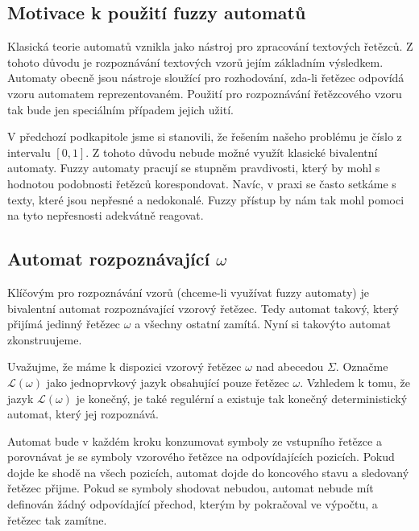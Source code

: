 \documentclass[a4paper,10pt]{article}
\begin{document}
\subsection{Motivace k použití fuzzy automatů}
Klasická teorie automatů vznikla jako nástroj pro zpracování textových řetězců. Z tohoto důvodu je rozpoznávání textových vzorů jejím základním výsledkem. Automaty obecně jsou nástroje sloužící pro rozhodování, zda-li řetězec odpovídá vzoru automatem reprezentovaném. Použití pro rozpoznávání řetězcového vzoru tak bude jen speciálním případem jejich užití.

V předchozí podkapitole jsme si stanovili, že řešením našeho problému je číslo z intervalu $[0,1]$. Z tohoto důvodu nebude možné využít klasické bivalentní automaty. Fuzzy automaty pracují se stupněm pravdivosti, který by mohl s hodnotou podobnosti řetězců korespondovat. Navíc, v praxi se často setkáme s texty, které jsou nepřesné a nedokonalé. Fuzzy přístup by nám tak mohl pomoci na tyto nepřesnosti adekvátně reagovat.

 
\subsection{Automat rozpoznávající $\omega$}
Klíčovým pro rozpoznávání vzorů (chceme-li využívat fuzzy automaty) je bivalentní automat rozpoznávající vzorový řetězec. Tedy automat takový, který přijímá jedinný řetězec $\omega$ a všechny ostatní zamítá. Nyní si takovýto automat zkonstruujeme.

Uvažujme, že máme k dispozici vzorový řetězec $\omega$ nad abecedou $\Sigma$. Označme $\mathcal{L}(\omega)$ jako jednoprvkový jazyk obsahující pouze řetězec $\omega$. Vzhledem k tomu, že jazyk $\mathcal{L}(\omega)$ je konečný, je také regulérní a existuje tak konečný deterministický automat, který jej rozpoznává.

Automat bude v každém kroku konzumovat symboly ze vstupního řetězce a porovnávat je se symboly vzorového řetězce na odpovídajících pozicích. Pokud dojde ke shodě na všech pozicích, automat dojde do koncového stavu a sledovaný řetězec přijme. Pokud se symboly shodovat nebudou, automat nebude mít definován žádný odpovídající přechod, kterým by pokračoval ve výpočtu, a řetězec tak zamítne. 
\end{document}
